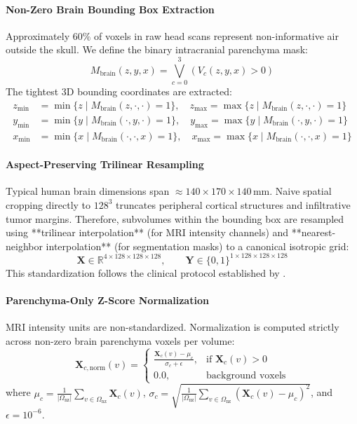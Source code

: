 \documentclass{article}
\begin{document}
\paragraph{Non-Zero Brain Bounding Box Extraction}
Approximately $60\%$ of voxels in raw head scans represent non-informative air outside the skull. We define the binary intracranial parenchyma mask:
\begin{equation}
    M_{\text{brain}}(z, y, x) = \bigvee_{c=0}^3 \left( V_c(z, y, x) > 0 \right)
\end{equation}
The tightest 3D bounding coordinates are extracted:
\begin{align}
    z_{\min} &= \min \{z \mid M_{\text{brain}}(z, \cdot, \cdot) = 1\}, \quad z_{\max} = \max \{z \mid M_{\text{brain}}(z, \cdot, \cdot) = 1\} \\
    y_{\min} &= \min \{y \mid M_{\text{brain}}(\cdot, y, \cdot) = 1\}, \quad y_{\max} = \max \{y \mid M_{\text{brain}}(\cdot, y, \cdot) = 1\} \\
    x_{\min} &= \min \{x \mid M_{\text{brain}}(\cdot, \cdot, x) = 1\}, \quad x_{\max} = \max \{x \mid M_{\text{brain}}(\cdot, \cdot, x) = 1\}
\end{align}

\paragraph{Aspect-Preserving Trilinear Resampling}
Typical human brain dimensions span $\approx 140 \times 170 \times 140\,\text{mm}$. Naive spatial cropping directly to $128^3$ truncates peripheral cortical structures and infiltrative tumor margins. Therefore, subvolumes within the bounding box are resampled using **trilinear interpolation** (for MRI intensity channels) and **nearest-neighbor interpolation** (for segmentation masks) to a canonical isotropic grid:
\begin{equation}
    \mathbf{X} \in \mathbb{R}^{4 \times 128 \times 128 \times 128}, \qquad \mathbf{Y} \in \{0, 1\}^{1 \times 128 \times 128 \times 128}
\end{equation}
This standardization follows the clinical protocol established by \citet{isensee2021nnunet}.

\paragraph{Parenchyma-Only Z-Score Normalization}
MRI intensity units are non-standardized. Normalization is computed strictly across non-zero brain parenchyma voxels per volume:
\begin{equation}
    \mathbf{X}_{c, \text{norm}}(v) = \begin{cases} \frac{\mathbf{X}_c(v) - \mu_c}{\sigma_c + \epsilon}, & \text{if } \mathbf{X}_c(v) > 0 \\ 0.0, & \text{background voxels} \end{cases}
\end{equation}
where $\mu_c = \frac{1}{|\Omega_{\text{nz}}|} \sum_{v \in \Omega_{\text{nz}}} \mathbf{X}_c(v)$, $\sigma_c = \sqrt{\frac{1}{|\Omega_{\text{nz}}|} \sum_{v \in \Omega_{\text{nz}}} (\mathbf{X}_c(v) - \mu_c)^2}$, and $\epsilon = 10^{-6}$.
\end{document}
